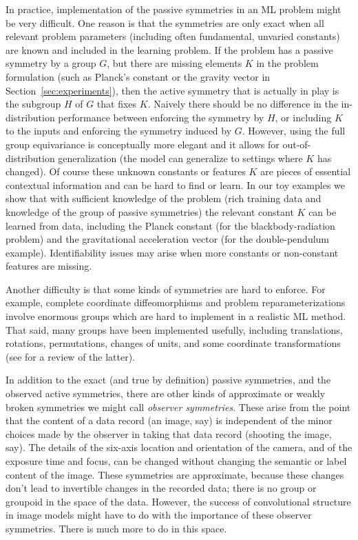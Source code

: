 \documentclass[preprint]{article} %
\newcommand{\sectionname}{Section}
\newcommand{\secref}[1]{\sectionname~\ref{#1}}
\begin{document}
In practice, implementation of the passive symmetries in an ML problem might be very difficult.
One reason is that the symmetries are only exact when all relevant problem parameters (including often fundamental, unvaried constants) are known and included in the learning problem.
If the problem has a passive symmetry by a group $G$, but there are missing elements $K$ in the problem formulation (such as Planck's constant or the gravity vector in \secref{sec:experiments}), then the active symmetry that is actually in play is the subgroup $H$ of $G$ that fixes $K$. 
Naively there should be no difference in the in-distribution performance between enforcing the symmetry by $H$, or including $K$ to the inputs and enforcing the symmetry induced by $G$. 
However, using the full group equivariance is conceptually more elegant and it allows for out-of-distribution generalization (the model can generalize to settings where  $K$ has changed).
Of course these unknown constants or features $K$ are pieces of essential contextual information and can be hard to find or learn. 
In our toy examples we show that with sufficient knowledge of the problem (rich training data and knowledge of the group of passive symmetries) the relevant constant $K$ can be learned from data, including the Planck constant (for the blackbody-radiation problem) and the gravitational acceleration vector (for the double-pendulum example).
Identifiability issues may arise when more constants or non-constant features are missing.

Another difficulty is that some kinds of symmetries are hard to enforce.
For example, complete coordinate diffeomorphisms and problem reparameterizations involve enormous groups which are hard to implement in a realistic ML method.
That said, many groups have been implemented usefully, including translations, rotations, permutations, changes of units, and some coordinate transformations (see \citealt{weiler} for a review of the latter). 

In addition to the exact (and true by definition) passive symmetries, and the observed active symmetries, there are other kinds of approximate or weakly broken symmetries we might call \emph{observer symmetries}.
These arise from the point that the content of a data record (an image, say) is independent of the minor choices made by the observer in taking that data record (shooting the image, say).
The details of the six-axis location and orientation of the camera, and of the exposure time and focus, can be changed without changing the semantic or label content of the image.
These symmetries are approximate, because these changes don't lead to invertible changes in the recorded data; there is no group or groupoid in the space of the data.
However, the success of convolutional structure in image models might have to do with the importance of these observer symmetries.
There is much more to do in this space.
\end{document}
